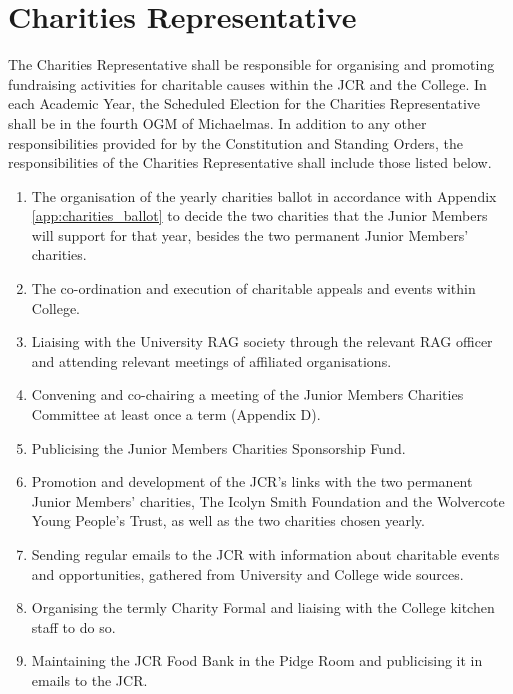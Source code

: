\section{Charities Representative}
\npara The Charities Representative shall be responsible for organising and promoting fundraising activities for charitable causes within the JCR and the College.
\npara In each Academic Year, the Scheduled Election for the Charities Representative shall be in the fourth OGM of Michaelmas.
\npara In addition to any other responsibilities provided for by the Constitution and Standing Orders, the responsibilities of the Charities Representative shall include those listed below.
\begin{enumerate}
	\item The organisation of the yearly charities ballot in accordance with Appendix \ref{app:charities_ballot} to decide the two charities that the Junior Members will support for that year, besides the two permanent Junior Members' charities.
	\item The co-ordination and execution of charitable appeals and events within College.
	\item Liaising with the University RAG society through the relevant RAG officer and attending relevant meetings of affiliated organisations.
	\item Convening and co-chairing a meeting of the Junior Members Charities Committee at least once a term (Appendix D).
	\item Publicising the Junior Members Charities Sponsorship Fund.
	\item Promotion and development of the JCR's links with the two permanent Junior Members' charities, The Icolyn Smith Foundation and the Wolvercote Young People's Trust, as well as the two charities chosen yearly.     
	\item Sending regular emails to the JCR with information about charitable events and opportunities, gathered from University and College wide sources.
	\item Organising the termly Charity Formal and liaising with the College kitchen staff to do so.
	\item Maintaining the JCR Food Bank in the Pidge Room and publicising it in emails to the JCR.
\end{enumerate}
